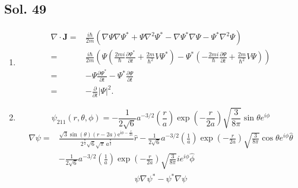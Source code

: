         \subsection*{Sol. 49}
        \begin{enumerate}
            \item 
            \begin{align*}
                \nabla\cdot\bm J = &
                \frac{i\hbar}{2m}
                (\nabla\Psi\nabla\Psi^* + 
                \Psi\nabla^2\Psi^* - 
                \nabla\Psi^*\nabla\Psi
                -
                \Psi^*\nabla^2\Psi
                )\\
                =&\frac{i\hbar}{2m}
                (\Psi(\frac{2mi}{\hbar}\frac{\partial\Psi^*}{\partial t}+\frac{2m}{\hbar^2}V\Psi^*) - 
                \Psi^*(-\frac{2mi}{\hbar}\frac{\partial\Psi}{\partial t}+\frac{2m}{\hbar^2}V\Psi))\\
                =&-\Psi\frac{\partial\Psi^*}{\partial t}
                -\Psi^*\frac{\partial\Psi}{\partial t}\\
                =&-\frac{\partial}{\partial t}|\Psi|^2.
            \end{align*}
            \item 
            $$
            \psi_{211}(r,\theta,\phi)
            =-
            \frac{1}{2\sqrt{6}}
            a^{-3/2}
            \left(\frac{r}{a}\right)
            \exp\left(-\frac{r}{2a}\right)
            \sqrt{\frac{3}{8\pi}}
            \sin\theta e^{i\phi}
            $$
            \begin{align*}
                \nabla\psi 
                 =&
                 \frac{\sqrt{3} \sin\left({\theta}\right) \left(r - 2a\right) \mathrm{e}^{\mathrm{i}{\phi} - \frac{r}{2a}}}{2^{\frac{7}{2}} \sqrt{6} \sqrt{\pi} \, a^{\frac{7}{2}}}\hat r
                 -
                 \frac{1}{2\sqrt{6}}
            a^{-3/2}
            \left(\frac{1}{a}\right)
            \exp\left(-\frac{r}{2a}\right)
            \sqrt{\frac{3}{8\pi}}
            \cos\theta e^{i\phi}
            \hat\theta \\
            &- 
            \frac{1}{2\sqrt{6}}
            a^{-3/2}
            \left(\frac{1}{a}\right)
            \exp\left(-\frac{r}{2a}\right)
            \sqrt{\frac{3}{8\pi}}
            i
            e^{i\phi}\hat\phi
            \end{align*}
            \begin{align*}
                \psi\nabla\psi^*
                -\psi^*\nabla\psi

\end{align*}
\end{enumerate}
